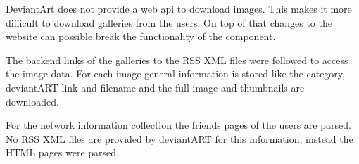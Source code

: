 DeviantArt does not provide a web api to download images. This makes it more 
difficult to download galleries from the users. 
On top of that changes to the website can possible break the functionality of the component.

The backend links of the galleries to the RSS XML files were followed to access
the image data. For each image general information is 
stored like the category, deviantART link and filename and the full image and 
thumbnails are downloaded.

For the network information collection the friends pages 
of the users are parsed. No RSS XML files are provided by deviantART for this
information, instead the HTML pages were parsed.




